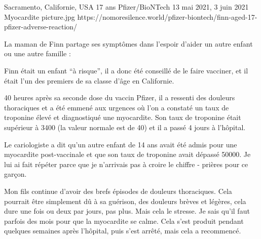 {Sacramento, Californie, USA}
{17 ans}
{Pfizer/BioNTech}
{13 mai 2021, 3 juin 2021}
{Myocardite}
{picture.jpg}
{https://nomoresilence.world/pfizer-biontech/finn-aged-17-pfizer-adverse-reaction/}
{

La maman de Finn partage ses symptômes dans l'espoir d'aider un autre enfant ou
une autre famille :

Finn était un enfant “à risque”, il a donc été conseillé de le faire vacciner,
et il était l'un des premiers de sa classe d'âge en Californie.

40 heures après sa seconde dose du vaccin Pfizer, il a ressenti des douleurs
thoraciques et a été emmené aux urgences où l'on a constaté un taux de troponine
élevé et diagnostiqué une myocardite. Son taux de troponine était supérieur à
3400 (la valeur normale est de 40) et il a passé 4 jours à l'hôpital.

Le cariologiste a dit qu'un autre enfant de 14 ans avait été admis pour une
myocardite post-vaccinale et que son taux de troponine avait dépassé 50000. Je
lui ai fait répéter parce que je n'arrivais pas à croire le chiffre - prières
pour ce garçon.

Mon fils continue d'avoir des brefs épisodes de douleurs thoraciques. Cela
pourrait être simplement dû à sa guérison, des douleurs brèves et légères, cela
dure une fois ou deux par jours, pas plus. Mais cela le stresse. Je sais qu'il
faut parfois des mois pour que la myocardite se calme. Cela s'est produit
pendant quelques semaines après l'hôpital, puis s'est arrêté, mais cela a
recommencé.

}
